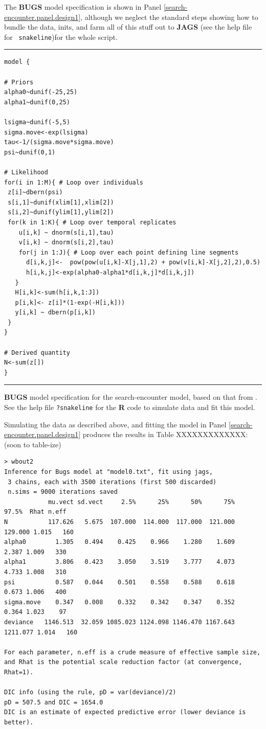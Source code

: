The {\bf BUGS} model specification is shown in Panel 
\ref{search-encounter.panel.design1}, although we neglect the standard
steps showing how to 
bundle the data, inits, and farm
all of this stuff out to {\bf JAGS} (see the help file for \mbox{\tt
  snakeline})for the whole script.

\begin{panel}[htp]
\centering
\rule[0.15in]{\textwidth}{.03in}
{\small
\begin{verbatim}
model {

# Priors
alpha0~dunif(-25,25)
alpha1~dunif(0,25)

lsigma~dunif(-5,5)
sigma.move<-exp(lsigma)
tau<-1/(sigma.move*sigma.move)
psi~dunif(0,1)

# Likelihood
for(i in 1:M){ # Loop over individuals
 z[i]~dbern(psi)
 s[i,1]~dunif(xlim[1],xlim[2])
 s[i,2]~dunif(ylim[1],ylim[2])
 for(k in 1:K){ # Loop over temporal replicates
    u[i,k] ~ dnorm(s[i,1],tau)
    v[i,k] ~ dnorm(s[i,2],tau)
    for(j in 1:J){ # Loop over each point defining line segments
      d[i,k,j]<-  pow(pow(u[i,k]-X[j,1],2) + pow(v[i,k]-X[j,2],2),0.5)
      h[i,k,j]<-exp(alpha0-alpha1*d[i,k,j]*d[i,k,j])
   }
   H[i,k]<-sum(h[i,k,1:J])
   p[i,k]<- z[i]*(1-exp(-H[i,k]))
   y[i,k] ~ dbern(p[i,k])
 }
}

# Derived quantity
N<-sum(z[])
}
\end{verbatim}
}
\rule[-0.15in]{\textwidth}{.03in}
\caption{
{\bf BUGS} model specification for the search-encounter model, based
on that from \citet{royle_etal:2011mee}. 
See the 
help file \mbox{\tt ?snakeline} for the {\bf R} code to simulate data
and fit this model. 
}
\label{search-encounter.panel.design1}
\end{panel}


Simulating the data as described above, and fitting the model in Panel
\ref{search-encounter.panel.design1} produces the results in Table
XXXXXXXXXXXXX: (soon to table-ize)

{\small
\begin{verbatim}
> wbout2
Inference for Bugs model at "model0.txt", fit using jags,
 3 chains, each with 3500 iterations (first 500 discarded)
 n.sims = 9000 iterations saved
            mu.vect sd.vect     2.5%      25%      50%      75%    97.5%  Rhat n.eff
N           117.626   5.675  107.000  114.000  117.000  121.000  129.000 1.015   160
alpha0        1.305   0.494    0.425    0.966    1.280    1.609    2.387 1.009   330
alpha1        3.806   0.423    3.050    3.519    3.777    4.073    4.733 1.008   310
psi           0.587   0.044    0.501    0.558    0.588    0.618    0.673 1.006   400
sigma.move    0.347   0.008    0.332    0.342    0.347    0.352    0.364 1.023    97
deviance   1146.513  32.059 1085.023 1124.098 1146.470 1167.643 1211.077 1.014   160

For each parameter, n.eff is a crude measure of effective sample size,
and Rhat is the potential scale reduction factor (at convergence, Rhat=1).

DIC info (using the rule, pD = var(deviance)/2)
pD = 507.5 and DIC = 1654.0
DIC is an estimate of expected predictive error (lower deviance is better).
\end{verbatim}
}


